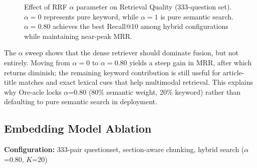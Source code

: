 \documentclass[11pt,a4paper]{article}
\begin{document}
\begin{figure}[h]
\centering
{}
\caption{Effect of RRF $\alpha$ parameter on Retrieval Quality (333-question set). $\alpha=0$ represents pure keyword, while $\alpha=1$ is pure semantic search. $\alpha=0.80$ achieves the best Recall@10 among hybrid configurations while maintaining near-peak MRR.}
\label{fig:alpha_sweep}
\end{figure}

The $\alpha$ sweep shows that the dense retriever should dominate fusion, but not entirely. Moving from $\alpha=0$ to $\alpha=0.80$ yields a steep gain in MRR, after which returns diminish; the remaining keyword contribution is still useful for article-title matches and exact lexical cues that help multimodal retrieval. This explains why Ore-acle locks $\alpha$=0.80 (80\% semantic weight, 20\% keyword) rather than defaulting to pure semantic search in deployment.

\subsection{Embedding Model Ablation}
\label{sec:embedding-axis}

\textbf{Configuration:} 333-pair questionset, section-aware chunking, hybrid search ($\alpha$=0.80, $K$=20)
\end{document}
